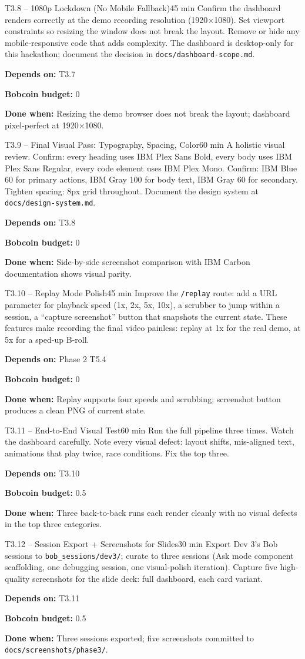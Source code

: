 \documentclass[11pt,letterpaper]{article}
\newcommand{\acceptance}[1]{\par\smallskip\textcolor{ibmgreen}{\textbf{Done when:}} #1}
\newcommand{\depends}[1]{\par\smallskip\textcolor{ibmorange}{\textbf{Depends on:}} #1}
\newcommand{\bobcost}[1]{\par\smallskip\textcolor{ibmaccent}{\textbf{Bobcoin budget:}} #1}
\begin{document}
\begin{task}{T3.8 -- 1080p Lockdown (No Mobile Fallback)}{45 min}
Confirm the dashboard renders correctly at the demo recording resolution (1920$\times$1080). Set viewport constraints so resizing the window does not break the layout. Remove or hide any mobile-responsive code that adds complexity. The dashboard is desktop-only for this hackathon; document the decision in \texttt{docs/dashboard-scope.md}.
\depends{T3.7}
\bobcost{0}
\acceptance{Resizing the demo browser does not break the layout; dashboard pixel-perfect at 1920$\times$1080.}
\end{task}

\begin{task}{T3.9 -- Final Visual Pass: Typography, Spacing, Color}{60 min}
A holistic visual review. Confirm: every heading uses IBM Plex Sans Bold, every body uses IBM Plex Sans Regular, every code element uses IBM Plex Mono. Confirm: IBM Blue 60 for primary actions, IBM Gray 100 for body text, IBM Gray 60 for secondary. Tighten spacing: 8px grid throughout. Document the design system at \texttt{docs/design-system.md}.
\depends{T3.8}
\bobcost{0}
\acceptance{Side-by-side screenshot comparison with IBM Carbon documentation shows visual parity.}
\end{task}

\begin{task}{T3.10 -- Replay Mode Polish}{45 min}
Improve the \texttt{/replay} route: add a URL parameter for playback speed (1x, 2x, 5x, 10x), a scrubber to jump within a session, a ``capture screenshot'' button that snapshots the current state. These features make recording the final video painless: replay at 1x for the real demo, at 5x for a sped-up B-roll.
\depends{Phase 2 T5.4}
\bobcost{0}
\acceptance{Replay supports four speeds and scrubbing; screenshot button produces a clean PNG of current state.}
\end{task}

\begin{task}{T3.11 -- End-to-End Visual Test}{60 min}
Run the full pipeline three times. Watch the dashboard carefully. Note every visual defect: layout shifts, mis-aligned text, animations that play twice, race conditions. Fix the top three.
\depends{T3.10}
\bobcost{0.5}
\acceptance{Three back-to-back runs each render cleanly with no visual defects in the top three categories.}
\end{task}

\begin{task}{T3.12 -- Session Export + Screenshots for Slides}{30 min}
Export Dev 3's Bob sessions to \texttt{bob\_sessions/dev3/}; curate to three sessions (Ask mode component scaffolding, one debugging session, one visual-polish iteration). Capture five high-quality screenshots for the slide deck: full dashboard, each card variant.
\depends{T3.11}
\bobcost{0.5}
\acceptance{Three sessions exported; five screenshots committed to \texttt{docs/screenshots/phase3/}.}
\end{task}
\end{document}
